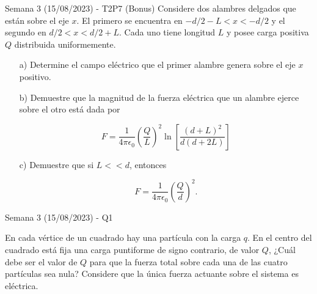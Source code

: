 \begin{frame}{Semana 3 (15/08/2023) - T2P7 (Bonus)}
    Considere dos alambres delgados que est\'an sobre el eje $x$. El primero se encuentra en $-d/2-L<x<-d/2$ y el segundo en $d/2<x<d/2+L$. Cada uno tiene longitud $L$ y posee carga positiva $Q$ distribuida uniformemente.
    
    \begin{itemize}
        \item[a)] Determine el campo el\'ectrico que el primer alambre genera sobre el eje $x$ positivo.
        \item[b)] Demuestre que la magnitud de la fuerza el\'ectrica que un alambre ejerce sobre el otro est\'a dada por
        
        \begin{equation}
            F=\frac{1}{4\pi\epsilon_0}\left(\frac{Q}{L}\right)^2\ln\left[\frac{\left(d+L\right)^2}{d(d+2L)}\right]
        \end{equation}
        
        \item[c)] Demuestre que si $L<<d$, entonces
        
        \begin{equation}
            F=\frac{1}{4\pi\epsilon_0}\left(\frac{Q}{d}\right)^2.
        \end{equation}
        
    \end{itemize}

\end{frame}

\begin{frame}{Semana 3 (15/08/2023) - Q1}
    
    En cada vértice de un cuadrado hay una partícula con la carga $q$. En el centro del cuadrado está fija una carga puntiforme de signo contrario, de valor $Q$, ¿Cuál debe ser el valor de $Q$ para que la fuerza total sobre cada una de las cuatro partículas sea nula? Considere que la única fuerza actuante sobre el sistema es eléctrica.

\end{frame}

